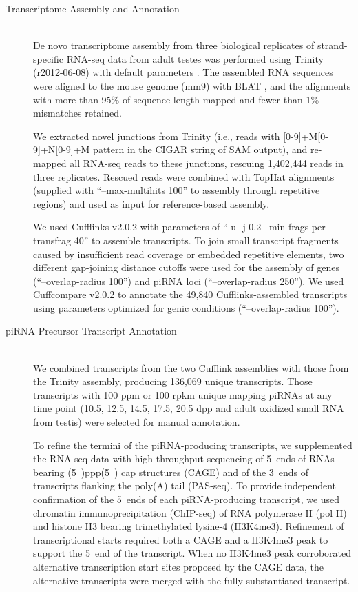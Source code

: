 \begin{description}
    \item[Transcriptome Assembly and Annotation] \hfill \\
    De novo transcriptome assembly from three biological replicates of strand-specific RNA-seq data from adult testes was performed using Trinity (r2012-06-08) with default parameters \citep{Grabherr2011}. The assembled RNA sequences were aligned to the mouse genome (mm9) with BLAT \citep{Kent2002}, and the alignments with more than 95\% of sequence length mapped and fewer than 1\% mismatches retained.

    We extracted novel junctions from Trinity (i.e., reads with [0-9]+M[0-9]+N[0-9]+M pattern in the CIGAR string of SAM output), and re-mapped all RNA-seq reads to these junctions, rescuing 1,402,444 reads in three replicates. Rescued reads were combined with TopHat alignments (supplied with ``–max-multihits 100'' to assembly through repetitive regions) and used as input for reference-based assembly.

    We used Cufflinks v2.0.2 \citep{Trapnell2010} with parameters of “-u -j 0.2 --min-frags-per-transfrag 40” to assemble transcripts. To join small transcript fragments caused by insufficient read coverage or embedded repetitive elements, two different gap-joining distance cutoffs were used for the assembly of genes (“--overlap-radius 100”) and piRNA loci (“--overlap-radius 250”). We used Cuffcompare v2.0.2 \citep{Trapnell2010} to annotate the 49,840 Cufflinks-assembled transcripts using parameters optimized for genic conditions (“--overlap-radius 100”).

    \item[piRNA Precursor Transcript Annotation] \hfill \\
    We combined transcripts from the two Cufflink assemblies with those from the Trinity assembly, producing 136,069 unique transcripts. Those transcripts with 100 ppm or 100 rpkm unique mapping piRNAs at any time point (10.5, 12.5, 14.5, 17.5, 20.5 dpp and adult oxidized small RNA from testis) were selected for manual annotation.

    To refine the termini of the piRNA-producing transcripts, we supplemented the RNA-seq data with high-throughput sequencing of 5\textprime~ends of RNAs bearing (5\textprime~)ppp(5\textprime~) cap structures (CAGE) and of the 3\textprime~ends of transcripts flanking the poly(A) tail (PAS-seq). To provide independent confirmation of the 5\textprime~ends of each piRNA-producing transcript, we used chromatin immunoprecipitation (ChIP-seq) of RNA polymerase II (pol II) and histone H3 bearing trimethylated lysine-4 (H3K4me3). Refinement of transcriptional starts required both a CAGE and a H3K4me3 peak to support the 5\textprime~end of the transcript. When no H3K4me3 peak corroborated alternative transcription start sites proposed by the CAGE data, the alternative transcripts were merged with the fully substantiated transcript.


\end{description}
